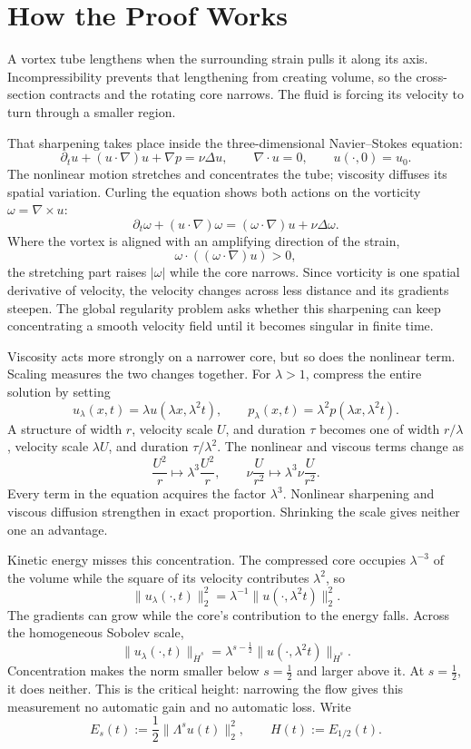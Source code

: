 \documentclass[11pt]{article}
\begin{document}
\section*{How the Proof Works}

A vortex tube lengthens when the surrounding strain pulls it along its axis. Incompressibility prevents that lengthening from creating volume, so the cross-section contracts and the rotating core narrows. The fluid is forcing its velocity to turn through a smaller region.

That sharpening takes place inside the three-dimensional Navier--Stokes equation:
\[
\partial_tu+(u\cdot\nabla)u+\nabla p=\nu\Delta u,
\qquad \nabla\cdot u=0,
\qquad u(\cdot,0)=u_0.
\]
The nonlinear motion stretches and concentrates the tube; viscosity diffuses its spatial variation. Curling the equation shows both actions on the vorticity \(\omega=\nabla\times u\):
\[
\partial_t\omega+(u\cdot\nabla)\omega
=(\omega\cdot\nabla)u+\nu\Delta\omega.
\]
Where the vortex is aligned with an amplifying direction of the strain,
\[
\omega\cdot((\omega\cdot\nabla)u)>0,
\]
the stretching part raises \(\lvert\omega\rvert\) while the core narrows. Since vorticity is one spatial derivative of velocity, the velocity changes across less distance and its gradients steepen. The global regularity problem asks whether this sharpening can keep concentrating a smooth velocity field until it becomes singular in finite time.

Viscosity acts more strongly on a narrower core, but so does the nonlinear term. Scaling measures the two changes together. For \(\lambda>1\), compress the entire solution by setting
\[
u_\lambda(x,t)=\lambda u(\lambda x,\lambda^2t),
\qquad
p_\lambda(x,t)=\lambda^2p(\lambda x,\lambda^2t).
\]
A structure of width \(r\), velocity scale \(U\), and duration \(\tau\) becomes one of width \(r/\lambda\), velocity scale \(\lambda U\), and duration \(\tau/\lambda^2\). The nonlinear and viscous terms change as
\[
\frac{U^2}{r}
\longmapsto
\lambda^3\frac{U^2}{r},
\qquad
\nu\frac{U}{r^2}
\longmapsto
\lambda^3\nu\frac{U}{r^2}.
\]
Every term in the equation acquires the factor \(\lambda^3\). Nonlinear sharpening and viscous diffusion strengthen in exact proportion. Shrinking the scale gives neither one an advantage.

Kinetic energy misses this concentration. The compressed core occupies \(\lambda^{-3}\) of the volume while the square of its velocity contributes \(\lambda^2\), so
\[
\|u_\lambda(\cdot,t)\|_2^2
=\lambda^{-1}\|u(\cdot,\lambda^2t)\|_2^2.
\]
The gradients can grow while the core's contribution to the energy falls. Across the homogeneous Sobolev scale,
\[
\|u_\lambda(\cdot,t)\|_{\dot H^s}
=\lambda^{s-\frac12}
\|u(\cdot,\lambda^2t)\|_{\dot H^s}.
\]
Concentration makes the norm smaller below \(s=\tfrac12\) and larger above it. At \(s=\tfrac12\), it does neither. This is the critical height: narrowing the flow gives this measurement no automatic gain and no automatic loss. Write
\[
E_s(t):=\frac12\|\Lambda^su(t)\|_2^2,
\qquad
H(t):=E_{1/2}(t).
\]
\end{document}
